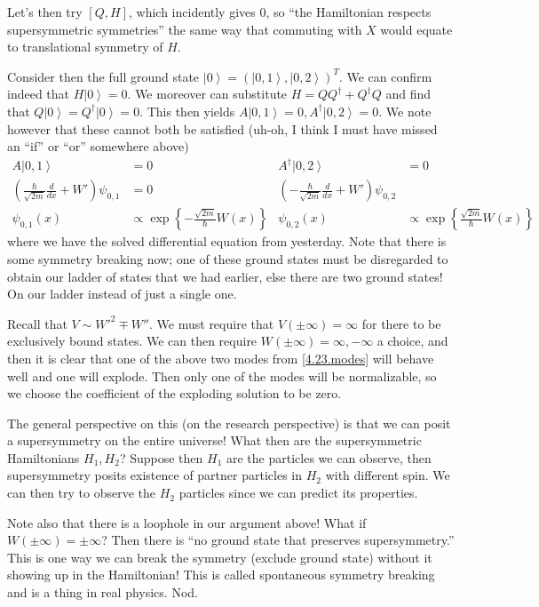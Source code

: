 \documentclass[10pt]{report}
\newcommand{\ket}[1]{\left|#1\right>}
\newcommand{\rd}[2]{\frac{d#1}{d#2}}
\begin{document}
Let's then try $[Q,H]$, which incidently gives $0$, so ``the Hamiltonian respects supersymmetric symmetries'' the same way that commuting with $X$ would equate to translational symmetry of $H$. 

Consider then the full ground state $\ket{0} = (\ket{0,1}, \ket{0,2})^T$. We can confirm indeed that $H\ket{0} = 0$. We moreover can substitute $H = QQ^\dagger + Q^\dagger Q$ and find that $Q\ket{0} = Q^\dagger\ket{0} = 0$. This then yields $A\ket{0,1} = 0, A^\dagger\ket{0,2} = 0$. We note however that these cannot both be satisfied (uh-oh, I think I must have missed an ``if'' or ``or'' somewhere above)
\begin{align}
    A\ket{0,1} &= 0 & A^\dagger\ket{0,2} &= 0\\
    \left(\frac{\hbar}{\sqrt{2m}}\rd{}{x} + W'\right) \psi_{0,1} &= 0 & \left( -\frac{\hbar}{\sqrt{2m}} \rd{}{x} + W' \right)\psi_{0,2}\\
    \psi_{0,1}(x) &\propto \exp\left\{ -\frac{\sqrt{2m}}{\hbar}W(x) \right\} & \psi_{0,2}(x) &\propto \exp\left\{ \frac{\sqrt{2m}}{\hbar}W(x) \right\}\label{4.23.modes}
\end{align}
where we have the solved differential equation from yesterday. Note that there is some symmetry breaking now; one of these ground states must be disregarded to obtain our ladder of states that we had earlier, else there are two ground states! On our ladder instead of just a single one.

Recall that $V \sim W'^2 \mp W''$. We must require that $V(\pm \infty) = \infty$ for there to be exclusively bound states. We can then require $W(\pm \infty) = \infty, -\infty$ a choice, and then it is clear that one of the above two modes from \eqref{4.23.modes} will behave well and one will explode. Then only one of the modes will be normalizable, so we choose the coefficient of the exploding solution to be zero. 

The general perspective on this (on the research perspective) is that we can posit a supersymmetry on the entire universe! What then are the supersymmetric Hamiltonians $H_1, H_2$? Suppose then $H_1$ are the particles we can observe, then supersymmetry posits existence of partner particles in $H_2$ with different spin. We can then try to observe the $H_2$ particles since we can predict its properties.

Note also that there is a loophole in our argument above! What if $W(\pm \infty) = \pm \infty$? Then there is ``no ground state that preserves supersymmetry.'' This is one way we can break the symmetry (exclude ground state) without it showing up in the Hamiltonian! This is called spontaneous symmetry breaking and is a thing in real physics. Nod. 
\end{document}

